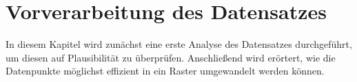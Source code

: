 \section{Vorverarbeitung des Datensatzes}
\label{sec:Datensatz}
In diesem Kapitel wird zunächst eine erste Analyse des Datensatzes durchgeführt, um diesen auf Plausibilität zu überprüfen.
Anschließend wird erörtert, wie die Datenpunkte möglichst effizient in ein Raster umgewandelt werden können.



